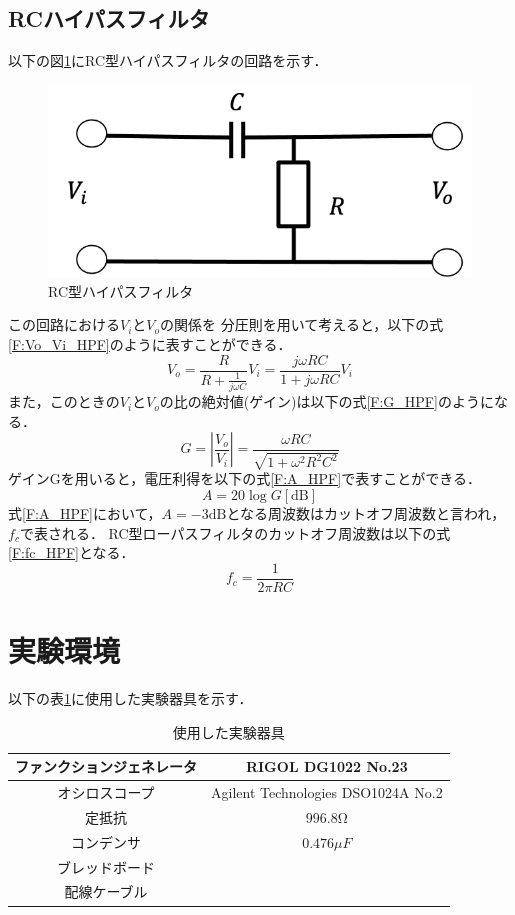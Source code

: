 \documentclass[a4paper,11pt]{jsarticle}
\begin{document}
\subsection{RCハイパスフィルタ}
以下の図\ref{RC_HPF}にRC型ハイパスフィルタの回路を示す．
\begin{figure}[H]
  \centering
  \includegraphics[width=0.3\linewidth]{picture/RC_HPF.png}
  \caption{RC型ハイパスフィルタ}
  \label{RC_HPF}
\end{figure}
この回路における$V_i$と$V_o$の関係を
分圧則を用いて考えると，以下の式\ref{F:Vo_Vi_HPF}のように表すことができる．
\begin{equation}
  V_o = \frac{R}{R+\frac{1}{j\omega C}}V_i = \frac{j\omega RC}{1+j\omega RC}V_i \label{F:Vo_Vi_HPF}
\end{equation}
また，このときの$V_i$と$V_o$の比の絶対値(ゲイン)は以下の式\ref{F:G_HPF}のようになる．
\begin{equation}
  G = \left|\frac{V_o}{V_i}\right| = \frac{\omega RC}{\sqrt{1 + \omega^2R^2C^2}} \label{F:G_HPF}
\end{equation}
ゲインGを用いると，電圧利得を以下の式\ref{F:A_HPF}で表すことができる．
\begin{equation}
  A = 20\log{G} [\si{\deci \bel}]\label{F:A_HPF}
\end{equation}
式\ref{F:A_HPF}において，$A=-3\si{\deci \bel}$となる周波数はカットオフ周波数と言われ，$f_c$で表される．
RC型ローパスフィルタのカットオフ周波数は以下の式\ref{F:fc_HPF}となる．
\begin{equation}
  f_c = \frac{1}{2\pi RC} \label{F:fc_HPF}
\end{equation}

\section{実験環境}
以下の表\ref{T:location}に使用した実験器具を示す．
\begin{table}[H]
  \begin{center}
    \caption{使用した実験器具}
    \begin{tabular}{|c|c|} \hline
      ファンクションジェネレータ & RIGOL DG1022 No.23                 \\ \hline
      オシロスコープ             & Agilent Technologies DSO1024A No.2 \\ \hline
      定抵抗                     & $996.8\si{\ohm}$                   \\ \hline
      コンデンサ                 & $0.476\si{\mu F}$                  \\ \hline
      ブレッドボード             &                                    \\ \hline
      配線ケーブル               &                                    \\ \hline
    \end{tabular}
    \label{T:location}
  \end{center}
\end{table}
\end{document}
